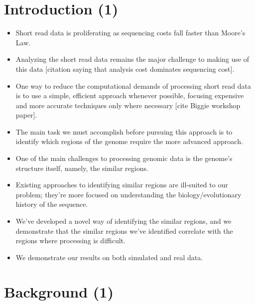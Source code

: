 \documentclass[10pt, conference, compsocconf]{IEEEtran}
\begin{document}
\section{Introduction (1)}
\begin{itemize}
\item{Short read data is proliferating as sequencing costs fall faster than Moore's Law.}
\item{Analyzing the short read data remains the major challenge to making use of this data [citation saying that analysis cost dominates sequencing cost].}
\item{One way to reduce the computational demands of processing short read data is to use a simple, efficient approach whenever possible, focusing expensive and more accurate techniques only where necessary [cite Biggie workshop paper].}
\item{The main task we must accomplish before pursuing this approach is to identify which regions of the genome require the more advanced approach.}
\item{One of the main challenges to processing genomic data is the genome's structure itself, namely, the similar regions.}
\item{Existing approaches to identifying similar regions are ill-suited to our problem; they're more focused on understanding the biology/evolutionary history of the sequence.}
\item{We've developed a novel way of identifying the similar regions, and we demonstrate that the similar regions we've identified correlate with the regions where processing is difficult.}
\item{We demonstrate our results on both simulated and real data.}
\end{itemize}



\section{Background (1)}
\end{document}
